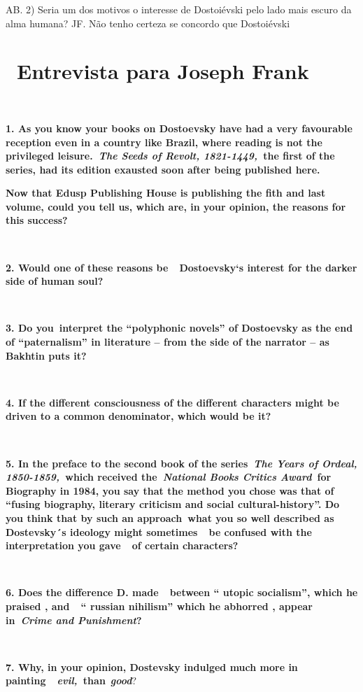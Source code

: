 AB. 2) Seria um dos motivos o interesse de Dostoiévski pelo lado mais
escuro da alma humana? JF. Não tenho certeza se concordo que Dostoiévski

\section{~Entrevista para Joseph Frank~}

\textbf{~}

\textbf{1. As you know your books on Dostoevsky have had a very
favourable reception even in a country like Brazil, where reading is not
the privileged leisure.~\emph{The Seeds of Revolt, 1821-1449,~}the first
of the series, had its edition exausted soon after being published
here.}

\textbf{Now that Edusp Publishing House is publishing the fith and last
volume, could you tell us, which are, in your opinion, the reasons for
this success?}

\textbf{~}

\textbf{2. Would one of these reasons be~~Dostoevsky`s interest for the
darker side of human soul?}

\textbf{~}

\textbf{3. Do you~interpret the ``polyphonic novels'' of Dostoevsky as
the end of ``paternalism'' in literature -- from the side of the
narrator -- as Bakhtin puts it?}

\textbf{~}

\textbf{4. If the different consciousness of the different characters
might be driven to a common denominator, which would be it?}

\textbf{~}

\textbf{5. In the preface to the second book of the series~\emph{The
Years of Ordeal, 1850-1859,~}which received the~\emph{National Books
Critics Award}~for Biography in 1984, you say that the method you chose
was that of ``fusing biography, literary criticism and social
cultural-history''. Do you think that by such an approach~what you so
well described as Dostevsky´s ideology might sometimes~~be confused with
the interpretation you gave~~of certain characters?}

\textbf{~}

\textbf{6. Does the difference D. made~~between `` utopic socialism'',
which he praised , and~~`` russian nihilism'' which he abhorred , appear
in~\emph{Crime and Punishment}?}

\textbf{~}

\textbf{7. Why, in your opinion, Dostevsky indulged much more in
painting~~\emph{evil,~}than}~\emph{\textbf{good}}?

